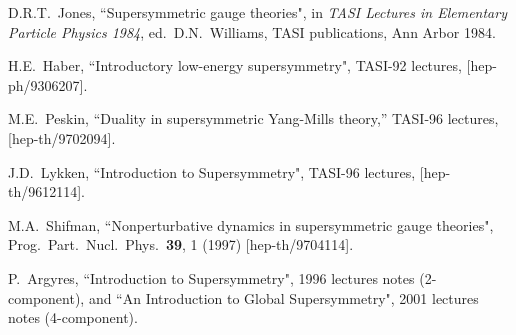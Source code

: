 \documentclass[11pt]{article}
\begin{document}
\begin{thebibliography}{999}
D.R.T.~Jones, 
  ``Supersymmetric gauge theories",
  in {\em TASI Lectures in Elementary Particle Physics 1984},
  ed.~D.N.~Williams, TASI publications, Ann Arbor 1984.

H.E.~Haber, 
  ``Introductory low-energy supersymmetry", 
  TASI-92 lectures, %
  [hep-ph/9306207].



  M.E.~Peskin,
  ``Duality in supersymmetric Yang-Mills theory,''
  TASI-96 lectures,
  [hep-th/9702094].


  
J.D.~Lykken, 
  ``Introduction to Supersymmetry",
  TASI-96 lectures, 
  [hep-th/9612114].

M.A.~Shifman, 
  ``Nonperturbative dynamics in supersymmetric gauge theories", 
  Prog.\ Part.\ Nucl.\ Phys.\  {\bf 39}, 1 (1997)
  [hep-th/9704114].


P.~Argyres, 
  ``Introduction to Supersymmetry", 1996 lectures notes (2-component),
and ``An Introduction to Global Supersymmetry", 2001 lectures notes 
(4-component).


\end{thebibliography}
\end{document}

